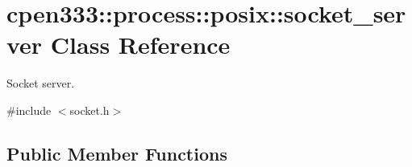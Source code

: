 \hypertarget{classcpen333_1_1process_1_1posix_1_1socket__server}{}\section{cpen333\+:\+:process\+:\+:posix\+:\+:socket\+\_\+server Class Reference}
\label{classcpen333_1_1process_1_1posix_1_1socket__server}


Socket server.  




{\ttfamily \#include $<$socket.\+h$>$}

\subsection*{Public Member Functions}
